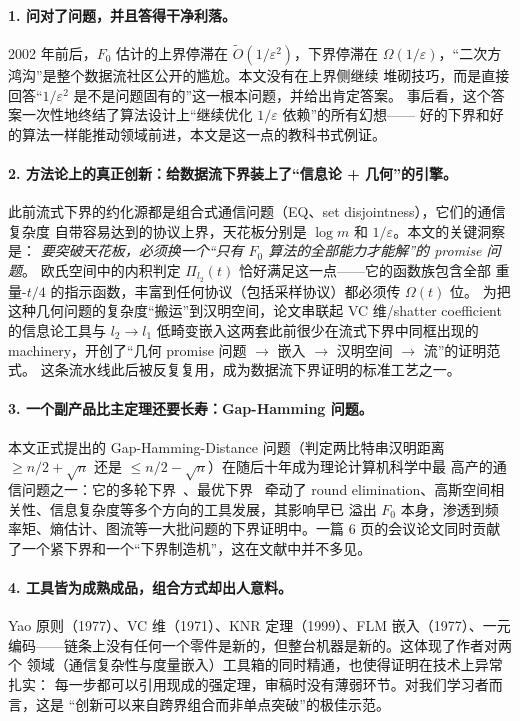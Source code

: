 \documentclass[UTF8, 11pt, a4paper, linestretch=1.15]{ctexart}
\theoremstyle{zhstyle}
\newcommand{\eps}{\varepsilon}
\newcommand{\Fzero}{F_0}
\begin{document}
	\paragraph{1. 问对了问题，并且答得干净利落。}
	2002 年前后，$\Fzero$ 估计的上界停滞在 $\tilde{O}(1/\eps^2)$，下界停滞在
	$\Omega(1/\eps)$，“二次方鸿沟”是整个数据流社区公开的尴尬。本文没有在上界侧继续
	堆砌技巧，而是直接回答“$1/\eps^2$ 是不是问题固有的”这一根本问题，并给出肯定答案。
	事后看，这个答案一次性地终结了算法设计上“继续优化 $1/\eps$ 依赖”的所有幻想——
	好的下界和好的算法一样能推动领域前进，本文是这一点的教科书式例证。
	
	\paragraph{2. 方法论上的真正创新：给数据流下界装上了“信息论 + 几何”的引擎。}
	此前流式下界的约化源都是组合式通信问题（EQ、set disjointness），它们的通信复杂度
	自带容易达到的协议上界，天花板分别是 $\log m$ 和 $1/\eps$。本文的关键洞察是：
	\emph{要突破天花板，必须换一个“只有 $\Fzero$ 算法的全部能力才能解”的 promise 问题}。
	欧氏空间中的内积判定 $\Pi_{l_2}(t)$ 恰好满足这一点——它的函数族包含全部
	重量-$t/4$ 的指示函数，丰富到任何协议（包括采样协议）都必须传 $\Omega(t)$ 位。
	为把这种几何问题的复杂度“搬运”到汉明空间，论文串联起 VC 维/shatter coefficient
	的信息论工具与 $l_2 \to l_1$ 低畸变嵌入这两套此前很少在流式下界中同框出现的
	machinery，开创了“几何 promise 问题 $\to$ 嵌入 $\to$ 汉明空间 $\to$ 流”的证明范式。
	这条流水线此后被反复复用，成为数据流下界证明的标准工艺之一。
	
	\paragraph{3. 一个副产品比主定理还要长寿：Gap-Hamming 问题。}
	本文正式提出的 Gap-Hamming-Distance 问题（判定两比特串汉明距离
	$\geq n/2+\sqrt{n}$ 还是 $\leq n/2-\sqrt{n}$）在随后十年成为理论计算机科学中最
	高产的通信问题之一：它的多轮下界~\cite{BC09}、最优下界~\cite{CR11} 牵动了
	round elimination、高斯空间相关性、信息复杂度等多个方向的工具发展，其影响早已
	溢出 $\Fzero$ 本身，渗透到频率矩、熵估计、图流等一大批问题的下界证明中。一篇
	6 页的会议论文同时贡献了一个紧下界和一个“下界制造机”，这在文献中并不多见。
	
	\paragraph{4. 工具皆为成熟成品，组合方式却出人意料。}
	Yao 原则（1977）、VC 维（1971）、KNR 定理（1999）、FLM 嵌入（1977）、一元
	编码——链条上没有任何一个零件是新的，但整台机器是新的。这体现了作者对两个
	领域（通信复杂性与度量嵌入）工具箱的同时精通，也使得证明在技术上异常扎实：
	每一步都可以引用现成的强定理，审稿时没有薄弱环节。对我们学习者而言，这是
	“创新可以来自跨界组合而非单点突破”的极佳示范。
	
\end{document}
